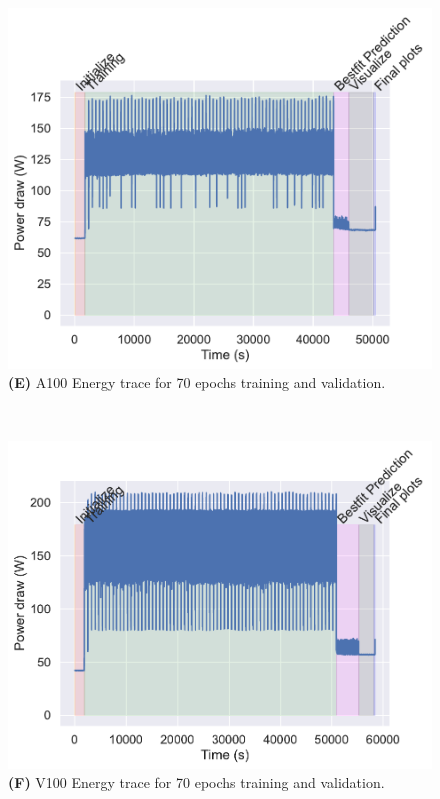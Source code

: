 \documentclass[utf8]{FrontiersinVancouver} %
\begin{document}
{\begin{figure}[htb]
\begin{center}
     \begin{minipage}[b]{0.44\textwidth}
       \includegraphics[width=1.0\linewidth]{images/a100-shaded-energy-70-epochs.pdf}
        {\bf (E)} A100 Energy trace for 70 epochs training and validation.
     \end{minipage}
     \ \
     \begin{minipage}[b]{0.44\textwidth}
        \includegraphics[width=1.0\linewidth]{images/v100-shaded-energy-70-epochs.pdf}
        {\bf (F)}  V100 Energy trace for 70 epochs training and validation.
     \end{minipage}
\end{center}


\end{figure}}
\end{document}
